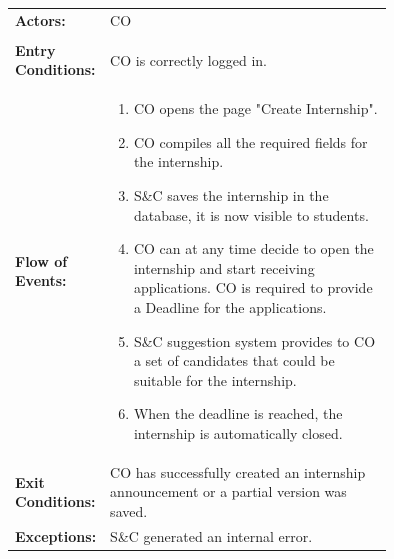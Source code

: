 \begin{center}
    \begin{longtable}{|l|p{0.75\linewidth}|}
        \hline
        \textbf{Actors:}           & CO                                                                                                                                                 \\                                                                                       \\
        \hline
        \textbf{Entry Conditions:} & CO is correctly logged in.                                                                                                                         \\
        \hline
        \textbf{Flow of Events:}   & \begin{enumerate}
                                         \item CO opens the page "Create Internship".
                                         \item CO compiles all the required fields for the internship.
                                         \item S\&C saves the internship in the database, it is now visible to students.
                                         \item CO can at any time decide to open the internship and start receiving applications. CO is required to provide a Deadline for the applications.
                                         \item S\&C suggestion system provides to CO a set of candidates that could be suitable for the internship.
                                         \item When the deadline is reached, the internship is automatically closed.
                                     \end{enumerate} \\
        \hline
        \textbf{Exit Conditions:}  & CO has successfully created an internship announcement or a partial version was saved.                                                             \\
        \hline
        \textbf{Exceptions:}       & S\&C generated an internal error.                                                                                                                  \\
        \hline
    \end{longtable}
\end{center}

